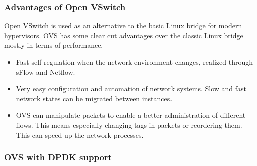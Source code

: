 \documentclass[11pt,a4paper,twoside,openright,bachelor,english]{netthesis}
\begin{document}
\subsubsection{Advantages of Open VSwitch}

Open VSwitch is used as an alternative to the basic Linux bridge for modern hypervisors. OVS has some clear cut advantages over the classic Linux bridge mostly in terms of performance. 
\begin{itemize}

\item Fast self-regulation when the network environment changes, realized through sFlow and Netflow. 

\item Very easy configuration and automation of network systems. Slow and fast network states can be migrated between instances. 

\item OVS can manipulate packets to enable a better administration of different flows. This means especially changing tags in packets or reordering them. This can speed up the network processes. \cite{pothuraju2016measuring}

\end{itemize}


\subsubsection{OVS with DPDK support}
\end{document}
